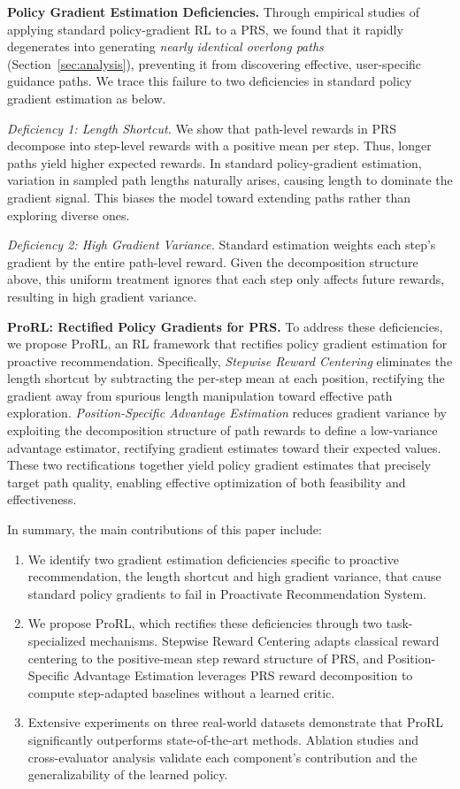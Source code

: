 \textbf{Policy Gradient Estimation Deficiencies.} Through empirical studies of applying standard policy-gradient RL to a PRS, we found that it rapidly degenerates into generating \emph{nearly identical overlong paths} (Section~\ref{sec:analysis}), preventing it from discovering effective, user-specific guidance paths. 
We trace this failure to two deficiencies in standard policy gradient estimation as below.

\emph{Deficiency 1: Length Shortcut.} We show that path-level rewards in PRS decompose into step-level rewards with a positive mean per step. Thus, longer paths yield higher expected rewards. In standard policy-gradient estimation, variation in sampled path lengths naturally arises, causing length to dominate the gradient signal. This biases the model toward extending paths rather than exploring diverse ones.

\emph{Deficiency 2: High Gradient Variance.} Standard estimation weights each step's gradient by the entire path-level reward. Given the decomposition structure above, this uniform treatment ignores that each step only affects future rewards, resulting in high gradient variance.

\textbf{ProRL: Rectified Policy Gradients for PRS.} 
To address these deficiencies, we propose ProRL, an RL framework that rectifies policy gradient estimation for proactive recommendation. 
Specifically, 
\emph{Stepwise Reward Centering} eliminates the length shortcut by subtracting the per-step mean at each position, rectifying the gradient away from spurious length manipulation toward effective path exploration. \emph{Position-Specific Advantage Estimation} reduces gradient variance by exploiting the decomposition structure of path rewards to define a low-variance advantage estimator, rectifying gradient estimates toward their expected values. These two rectifications together yield policy gradient estimates that precisely target path quality, enabling effective optimization of both feasibility and effectiveness.

In summary, the main contributions of this paper include:
\begin{enumerate}[leftmargin=*]

\item We identify two gradient estimation deficiencies specific to proactive recommendation, the length shortcut and high gradient variance, that cause standard policy gradients to fail in Proactivate Recommendation System.

\item We propose ProRL, which rectifies these deficiencies through two task-specialized mechanisms. Stepwise Reward Centering adapts classical reward centering to the positive-mean step reward structure of PRS, and Position-Specific Advantage Estimation leverages PRS reward decomposition to compute step-adapted baselines without a learned critic.

\item Extensive experiments on three real-world datasets demonstrate that ProRL significantly outperforms state-of-the-art methods. Ablation studies and cross-evaluator analysis validate each component's contribution and the generalizability of the learned policy.
\end{enumerate}